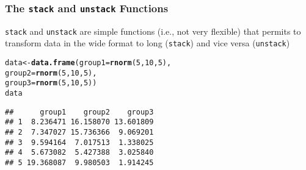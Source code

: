 \documentclass[paper=screen,mathserif]{beamer}\usepackage[]{graphicx}\usepackage[]{color}
\makeatletter
\newcommand{\hlnum}[1]{\textcolor[rgb]{0.686,0.059,0.569}{#1}}%
\newcommand{\hlstd}[1]{\textcolor[rgb]{0.345,0.345,0.345}{#1}}%
\newcommand{\hlkwb}[1]{\textcolor[rgb]{0.69,0.353,0.396}{#1}}%
\newcommand{\hlkwc}[1]{\textcolor[rgb]{0.333,0.667,0.333}{#1}}%
\newcommand{\hlkwd}[1]{\textcolor[rgb]{0.737,0.353,0.396}{\textbf{#1}}}%
\newenvironment{kframe}{%
 \def\at@end@of@kframe{}%
 \ifinner\ifhmode%
  \def\at@end@of@kframe{\end{minipage}}%
  \begin{minipage}{\columnwidth}%
 \fi\fi%
 \def\FrameCommand##1{\hskip\@totalleftmargin \hskip-\fboxsep
 \colorbox{shadecolor}{##1}\hskip-\fboxsep
     \hskip-\linewidth \hskip-\@totalleftmargin \hskip\columnwidth}%
 \MakeFramed {\advance\hsize-\width
   \@totalleftmargin\z@ \linewidth\hsize
   \@setminipage}}%
 {\par\unskip\endMakeFramed%
 \at@end@of@kframe}
\newenvironment{knitrout}{}{} %
\newcommand{\ft}[1]{\frametitle{#1}}
\makeatother
\begin{document}
\begin{frame}[fragile]
  \ft{The {\tt stack} and {\tt unstack} Functions}
  
  \verb=stack= and \verb=unstack= are simple functions (i.e., not very
  flexible) that permits to transform data in the wide format to long
  (\verb=stack=) and vice versa (\verb=unstack=)
\begin{knitrout}\scriptsize
{}\color{fgcolor}\begin{kframe}
\begin{alltt}
\hlstd{data} \hlkwb{<-} \hlkwd{data.frame}\hlstd{(}\hlkwc{group1} \hlstd{=} \hlkwd{rnorm}\hlstd{(}\hlnum{5}\hlstd{,} \hlnum{10}\hlstd{,} \hlnum{5}\hlstd{),}
                   \hlkwc{group2} \hlstd{=} \hlkwd{rnorm}\hlstd{(}\hlnum{5}\hlstd{,} \hlnum{10}\hlstd{,} \hlnum{5}\hlstd{),}
                   \hlkwc{group3} \hlstd{=} \hlkwd{rnorm}\hlstd{(}\hlnum{5}\hlstd{,} \hlnum{10}\hlstd{,} \hlnum{5}\hlstd{))}
\hlstd{data}
\end{alltt}
\begin{verbatim}
##      group1    group2    group3
## 1  8.236471 16.158070 13.601809
## 2  7.347027 15.736366  9.069201
## 3  9.594164  7.017513  1.338025
## 4  5.673082  5.427388  3.025840
## 5 19.368087  9.980503  1.914245
\end{verbatim}
\end{kframe}
\end{knitrout}
\end{frame}
\end{document}

